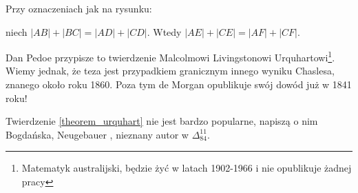 %

\begin{theorem}[Urquharta]
\label{theorem_urquhart}%
%
    Przy oznaczeniach jak na rysunku:
    \begin{center}
\begin{comment}
    \begin{tikzpicture}[scale=.4]
        \tkzDefPoint(0, 0){E}
        \tkzDefPoint(267:5){E1}
        \tkzDefPoint(250:5){E2}
        \tkzDefPoint(165:5){E3}
        \tkzDefPoint(135:5){E4}
        
        \tkzDefLine[tangent at=E1](E) \tkzGetPoint{tan1}
        \tkzDefLine[tangent at=E2](E) \tkzGetPoint{tan2}
        \tkzDefLine[tangent at=E3](E) \tkzGetPoint{tan3}
        \tkzDefLine[tangent at=E4](E) \tkzGetPoint{tan4}
        
        \tkzInterLL(E4,tan4)(E1,tan1) \tkzGetPoint{S1}
        \tkzInterLL(E4,tan4)(E2,tan2) \tkzGetPoint{S2}
        \tkzInterLL(E3,tan3)(E1,tan1) \tkzGetPoint{S3}
        \tkzInterLL(E3,tan3)(E2,tan2) \tkzGetPoint{S4}

        \tkzInterLL(S3,S4)(S1,S2) \tkzGetPoint{Gorny}
        \tkzInterLL(S1,S3)(S2,S4) \tkzGetPoint{Dolny}

        \tkzLabelPoint[below](S1){$A$}
        \tkzLabelPoint[above left](S2){$D$}
        \tkzLabelPoint(S3){$B$}
        \tkzLabelPoint[above right](S4){$C$}
        \tkzLabelPoint(Dolny){$E$}
        \tkzLabelPoint[right](Gorny){$F$}

        \tkzDrawSegments[line width=0.2mm](S1,Dolny S1,Gorny S3,Gorny S2,Dolny)
        \tkzDrawPoints[size=3,color=black,fill=black!50](S1,S2,S3,S4,Dolny,Gorny)
\end{tikzpicture}
\end{comment}
    \end{center}
    niech $|AB| + |BC| = |AD| + |CD|$.
    Wtedy $|AE| + |CE| = |AF| + |CF|$.
\end{theorem}

Dan Pedoe \cite{pedoe_1976} przypisze to twierdzenie Malcolmowi Livingstonowi Urquhartowi\footnote{Matematyk australijski, będzie żyć w latach 1902-1966 i nie opublikuje żadnej pracy}.
%
%
Wiemy jednak, że teza jest przypadkiem granicznym innego wyniku Chaslesa, znanego około roku 1860.
Poza tym de Morgan opublikuje swój dowód już w 1841 roku!

Twierdzenie \ref{theorem_urquhart} nie jest bardzo popularne, napiszą o nim Bogdańska, Neugebauer \cite[s. 97]{neugebauer_2018}, nieznany autor w $\Delta_{84}^{11}$.

%